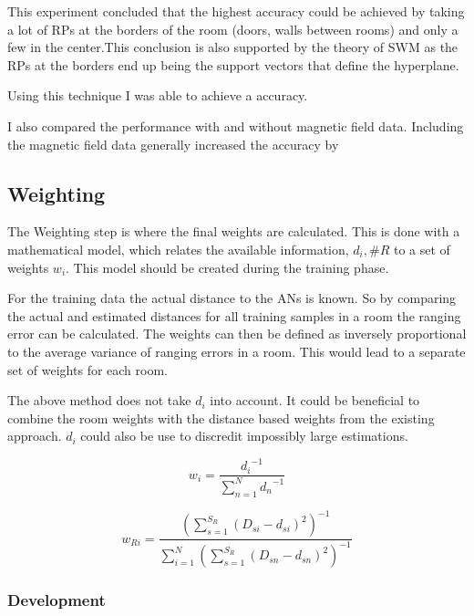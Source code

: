 This experiment concluded that the highest accuracy could be achieved by taking a lot of RPs at the borders of the room (doors, walls between rooms) and only a few in the center.This conclusion is also supported by the theory of SWM as the RPs at the borders end up being the support vectors that define the hyperplane.

Using this technique I was able to achieve a  accuracy. 

I also compared the performance with and without magnetic field data. Including the magnetic field data generally increased the accuracy by 

\subsection{Weighting}

The Weighting step is where the final weights are calculated. This is done with a mathematical model, which relates the available information, \(d_i,\#R\) to a set of weights \(w_i\). This model should be created during the training phase.

For the training data the actual distance to the ANs is known. So by comparing the actual and estimated distances for all training samples in a room the ranging error can be calculated. The weights can then be defined as inversely proportional to the average variance of ranging errors in a room. This would lead to a separate set of weights for each room.

The above method does not take \(d_i\) into account. It could be beneficial to combine the room weights with the distance based weights from the existing approach. \(d_i\) could also be use to discredit impossibly large estimations.

\begin{equation}
w_{i}=\frac{{d_i}^{-1}}{\sum_{n=1}^{N}{d_n}^{-1}}
\end{equation}

\begin{equation}
w_{Ri}=\frac{(\sum_{s=1}^{S_R}{(D_{si}-d_{si})^2})^{-1}}{\sum_{i=1}^{N}{(\sum_{s=1}^{S_R}{(D_{sn}-d_{sn})^2})^{-1}}}
\end{equation}


\subsubsection{Development}
\label{WeightingModelDefinition}

